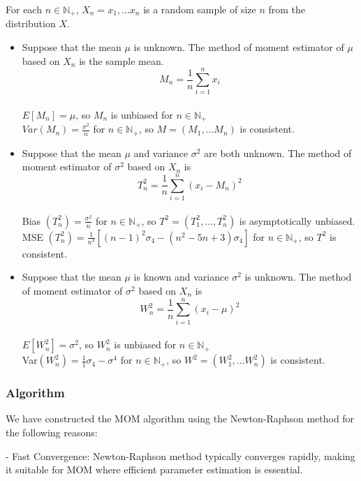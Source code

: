 \documentclass[12pt]{article}
\begin{document}
	For each $n \in \mathbb{N}_{+}$, $X_{n} = {x_{1},...x_{n}}$ is a random sample of size $n$ from the distribution $X$.
	\begin{itemize}	
		\item  Suppose that the mean $\mu$ is unknown. The method of moment estimator of  $\mu$ based on $X_{n}$ is the sample mean.
		$$M_{n} = \frac{1}{n}\sum_{i=1}^{n} x_{i}$$
		\\
		$E[M_{n}] = \mu$, so $M_{n}$ is unbiased for $n \in \mathbb{N}_{+}$
		\\
		$Var(M_{n}) = \frac{\sigma^{2}}{n}$ for $n \in \mathbb{N}_{+}$, so $M = (M_{1},...M_{n})$ is consistent.
		
		\item Suppose that the mean $\mu$ and variance $\sigma^{2}$ are both unknown. The method of moment estimator of  $\sigma^{2}$ based on $X_{n}$ is 
		$$T^{2}_{n} = \frac{1}{n}\sum_{i=1}^{n} (x_{i} - M_{n})^{2}$$
		\\
		Bias $(T^{2}_{n}) = \frac{\sigma^{2}}{n}$ for $n \in \mathbb{N}_{+}$, so $T^{2} = (T^{2}_{1}, \dots, T^{2}_{n})$ is asymptotically unbiased. \\
		MSE $(T^{2}_{n}) = \frac{1}{n^{3}} [(n-1)^{2}\sigma_{4} - (n^{2} - 5n + 3)\sigma_{4}]$ for $n \in \mathbb{N}_{+}$, so $T^{2}$ is consistent.
		 
		\item Suppose that the mean $\mu$ is known and variance $\sigma^{2}$ is  unknown. The method of moment estimator of  $\sigma^{2}$ based on $X_{n}$ is 
		$$W^{2}_{n} = \frac{1}{n}\sum_{i=1}^{n} (x_{i} - \mu)^{2}$$
		\\$E[W^{2}_{n}] = \sigma^{2}$, so $W^{2}_{n}$ is unbiased for $n \in \mathbb{N}_{+}$
		\\
		Var$(W^{2}_{n}) = \frac{1}{1}\sigma_{4} - \sigma^{4}$ for $n \in \mathbb{N}_{+}$, so $W^{2} = (W^{2}_{1},...W^{2}_{n})$ is consistent.
		
		\end{itemize}
		
		\subsubsection{Algorithm}
		We have constructed the MOM algorithm using the Newton-Raphson method for the following reasons:
		
		- Fast Convergence: Newton-Raphson method typically converges rapidly, making it suitable for MOM where efficient parameter estimation is essential.
		
\end{document}

